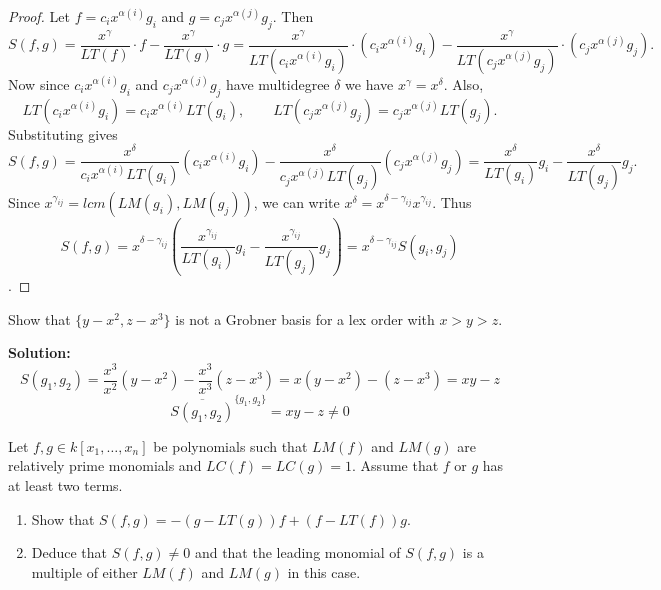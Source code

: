 \begin{proof}
    Let $f = c_i x^{\alpha(i)} g_i$ and $g = c_j x^{\alpha(j)} g_j$.
    Then 
    \[
    S(f, g) = \frac{x^\gamma}{LT(f)} \cdot f - \frac{x^\gamma}{LT(g)} \cdot g 
    = \frac{x^\gamma}{LT(c_i x^{\alpha(i)} g_i)} \cdot (c_i x^{\alpha(i)} g_i) 
    - \frac{x^\gamma}{LT(c_j x^{\alpha(j)} g_j)} \cdot (c_j x^{\alpha(j)} g_j).
    \]
    Now since $c_i x^{\alpha(i)} g_i$ and $c_j x^{\alpha(j)} g_j$ have multidegree $\delta$ we have 
    $x^\gamma = x^\delta$. Also,
    \[
    LT(c_i x^{\alpha(i)} g_i) = c_i x^{\alpha(i)} LT(g_i), \qquad
    LT(c_j x^{\alpha(j)} g_j) = c_j x^{\alpha(j)} LT(g_j).
    \]
    Substituting gives
    \[
    S(f,g)
    =
    \frac{x^\delta}{c_i x^{\alpha(i)} LT(g_i)} (c_i x^{\alpha(i)} g_i)
    -
    \frac{x^\delta}{c_j x^{\alpha(j)} LT(g_j)} (c_j x^{\alpha(j)} g_j)
    =
    \frac{x^\delta}{LT(g_i)} g_i
    -
    \frac{x^\delta}{LT(g_j)} g_j.
    \]
    Since $x^{\gamma_{ij}} = lcm(LM(g_i), LM(g_j))$, we can write
    $x^\delta = x^{\delta - \gamma_{ij}} x^{\gamma_{ij}}$. Thus
    \[
    S(f,g)
    =
    x^{\delta - \gamma_{ij}}
    \left(
    \frac{x^{\gamma_{ij}}}{LT(g_i)} g_i
    -
    \frac{x^{\gamma_{ij}}}{LT(g_j)} g_j
    \right)
    =
    x^{\delta - \gamma_{ij}} S(g_i,g_j)\].
\end{proof}


\begin{tcolorbox}[title=Problem 9, breakable]
    Show that $\{y - x^2, z - x^3\}$ is not a Grobner basis for a lex order with $x > y > z$.
\end{tcolorbox}

\textbf{Solution: }
\[
S(g_1,g_2)
=
\frac{x^3}{x^2}(y-x^2)-\frac{x^3}{x^3}(z-x^3)
=
x(y-x^2)-(z-x^3)
=
xy-z
\]
\[
\overline{S(g_1,g_2)}^{\{g_1,g_2\}} = xy - z \neq 0
\]


\begin{tcolorbox}[title=Problem 11, breakable]
    Let $f, g \in k[x_1, \ldots, x_n]$ be polynomials such that $LM(f)$ and $LM(g)$ are 
    relatively prime monomials and $LC(f) = LC(g) = 1$. 
    Assume that $f$ or $g$ has at least two terms.
    \begin{enumerate}
        \item Show that $S(f, g) = -(g - LT(g))f + (f - LT(f))g$.
        \item Deduce that $S(f, g) \ne 0$ and that the leading monomial of $S(f, g)$
        is a multiple of either $LM(f)$ and $LM(g)$ in this case.
    \end{enumerate}
\end{tcolorbox}

